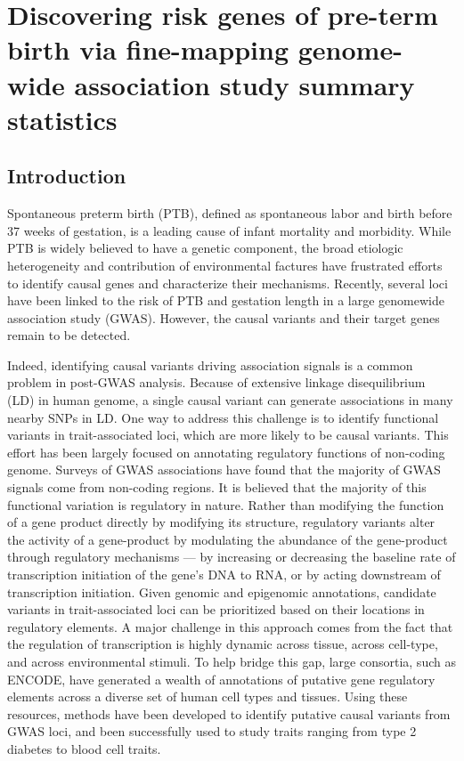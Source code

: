 \chapter{Discovering risk genes of pre-term birth via fine-mapping genome-wide association study summary statistics}

\section{Introduction}\label{sec:org59556ac}

Spontaneous preterm birth (PTB), defined as spontaneous labor and birth before 37 weeks of gestation, is a leading cause of infant mortality and morbidity. While PTB is widely believed to have a genetic component, the broad etiologic heterogeneity and contribution of environmental factures have frustrated efforts to identify causal genes and characterize their mechanisms\cite{crider2005genetic}. Recently, several loci have been linked to the risk of PTB and gestation length in a large genomewide association study (GWAS). However, the causal variants and their target genes remain to be detected.  

Indeed, identifying causal variants driving association signals is a common problem in post-GWAS analysis. Because of extensive linkage disequilibrium (LD) in human genome, a single causal variant can generate associations in many nearby SNPs in LD. One way to address this challenge is to identify functional variants in trait-associated loci, which are more likely to be causal variants. This effort has been largely focused on annotating regulatory functions of non-coding genome. Surveys of GWAS associations have found that the majority of GWAS signals come from non-coding regions. It is believed that the majority of this functional variation is regulatory in nature.  Rather than modifying the function of a gene product directly by modifying its structure, regulatory variants alter the activity of a gene-product by modulating the abundance of the gene-product through regulatory mechanisms --- by increasing or decreasing the baseline rate of transcription initiation of the gene's DNA to RNA, or by acting downstream of transcription initiation. Given genomic and epigenomic annotations, candidate variants in trait-associated loci can be prioritized based on their locations in regulatory elements. A major challenge in this approach comes from the fact that the regulation of transcription is highly dynamic across tissue, across cell-type, and across environmental stimuli. %
To help bridge this gap, large consortia, such as ENCODE, have generated a wealth of annotations of putative gene regulatory elements across a diverse set of human cell types and tissues. Using these resources, methods have been developed to identify putative causal variants from GWAS loci, and been successfully used to study traits ranging from type 2 diabetes to blood cell traits. 

